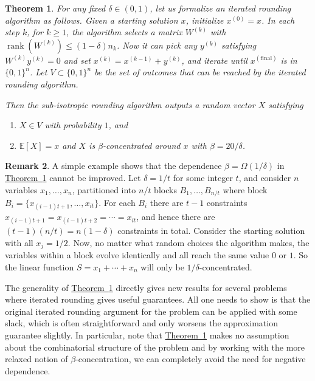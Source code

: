 \documentclass[11pt]{article}
\newcommand{\rank}{\operatorname{rank}}
\newcommand{\E}{\mathbb{E}}
\newtheorem{theorem}{Theorem}[section]
\theoremstyle{definition}
\newtheorem{remark}[theorem]{Remark}
\newcommand{\expref}[2]{\texorpdfstring{\hyperref[#2]{#1~\ref{#2}}}{#1~\ref{#2}}}
\begin{document}
\begin{theorem}
\label{thm:main}
For any fixed $\delta \in (0,1)$, let us formalize an iterated rounding algorithm as follows. Given a starting solution $x$, initialize $x^{(0)}=x$. In each step $k$, for $k\geq 1$, the algorithm selects a matrix $W^{(k)}$ with
$\rank(W^{(k)}) \leq  (1-\delta)n_k$. Now it can pick \emph{any} $y^{(k)}$ satisfying $W^{(k)}y^{(k)}=0$ and set $x^{(k)} = x^{(k-1)} + y^{(k)}$, and iterate until $x^{(\text{final})}$ is in $\{0,1\}^n$.
Let $V \subset \{0,1\}^n$ be the set of outcomes that can be reached by the iterated rounding algorithm. 

Then the sub-isotropic rounding algorithm outputs a random vector $X$ satisfying 
\begin{enumerate} \item $X \in V$ with probability $1$, and 
\item  $\E[X]=x$ and $X$ is $\beta$-concentrated around $x$ with $\beta=20/\delta$.
\end{enumerate}

%
%
%
%
%
%
\end{theorem}



\begin{remark} A simple example shows that the dependence $\beta = \Omega(1/\delta)$ in
\expref{Theorem}{thm:main} cannot be improved.
Let $\delta=1/t$ for some integer $t$, and consider $n$ variables $x_1,\ldots,x_n$, partitioned into $n/t$ blocks $B_1,\ldots,B_{n/t}$ where block $B_i = \{x_{(i-1)t+1}, \ldots, x_{it}\}$.
For each $B_i$ there are
$t-1$ constraints $x_{(i-1)t+1} =  x_{(i-1)t+2} =  \cdots = x_{it}$, and hence there are $(t-1)(n/t) = n(1-\delta)$ constraints in total.
Consider the starting solution with all $x_j=1/2$.
Now, no matter what random choices the algorithm makes, the variables within a block evolve identically and all reach the same value $0$ or $1$.
%
So the linear function $S=x_1+\cdots+x_n$ will only be $1/\delta$-concentrated.
\end{remark}
%


The generality of \expref{Theorem}{thm:main} directly gives new results for several problems where iterated rounding gives useful guarantees. All one needs to show is that the original iterated rounding argument for the problem
can be applied with some slack, which is often straightforward and only worsens the approximation guarantee slightly. 
%
In particular, note that \expref{Theorem}{thm:main} makes no assumption about the combinatorial structure of the problem and by working with the more relaxed notion of  $\beta$-concentration, we can completely avoid the need for negative dependence.
\end{document}
